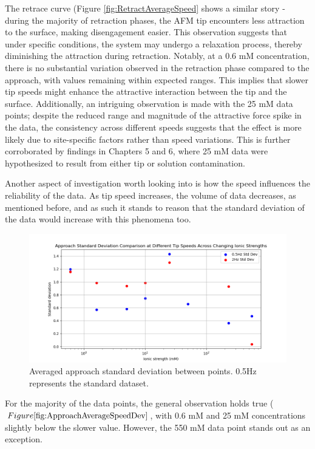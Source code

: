 The retrace curve (Figure \ref{fig:RetractAverageSpeed} shows a similar story - 
during the majority of retraction phases, the AFM tip encounters less attraction to the surface, making disengagement easier. This observation suggests that under specific conditions, the system may undergo a relaxation process, thereby diminishing the attraction during retraction. Notably, at a 0.6 mM concentration, there is no substantial variation observed in the retraction phase compared to the approach, with values remaining within expected ranges. This implies that slower tip speeds might enhance the attractive interaction between the tip and the surface. Additionally, an intriguing observation is made with the 25 mM data points; despite the reduced range and magnitude of the attractive force spike in the data, the consistency across different speeds suggests that the effect is more likely due to site-specific factors rather than speed variations. This is further corroborated by findings in Chapters 5 and 6, where 25 mM data were hypothesized to result from either tip or solution contamination.

Another aspect of investigation worth looking into is how the speed influences the reliability of the data. As tip speed increases, the volume of data decreases, as mentioned before, and as such it stands to reason that the standard deviation of the data would increase with this phenomena too.

\begin{figure}[h!]
\centering
\includegraphics[width=\textwidth]{chapter7/Tip speed/Standard deviation change.png}
\caption{Averaged approach standard deviation between points. 0.5Hz represents the standard dataset.}
\label{fig:ApproachAverageSpeedDev}
\end{figure}

For the majority of the data points, the general observation holds true ($Figure \ref{fig:ApproachAverageSpeedDev}$, with 0.6 mM and 25 mM concentrations slightly below the slower value. However, the 550 mM data point stands out as an exception. 


